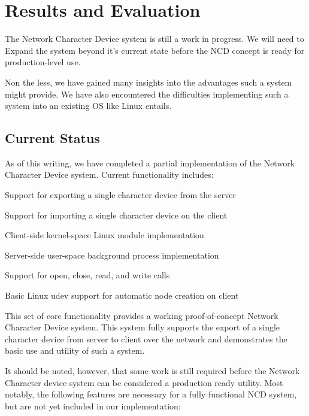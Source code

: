 \documentclass[11pt,twocolumn]{article}
\newenvironment{packed_item}{
\begin{itemize}
  \setlength{\itemsep}{1pt}
  \setlength{\parskip}{0pt}
  \setlength{\parsep}{0pt}
}{\end{itemize}}
\begin{document}

\section{Results and Evaluation}
\label{sec:results}

The Network Character Device system is still a work in
progress. We will need to Expand the system beyond it's current state
before the NCD concept is ready for production-level use.

Non the less, we have gained many insights into the advantages such a
system might provide. We have also encountered the difficulties
implementing such a system into an existing OS like Linux entails.

\subsection{Current Status}
\label{sec:currentstatus}

As of this writing, we have completed a partial implementation of
the Network Character Device system. Current functionality includes:

\begin{packed_item}
\item Support for exporting a single character device from the server
\item Support for importing a single character device on the client
\item Client-side kernel-space Linux module implementation
\item Server-side user-space background process implementation
\item Support for open, close, read, and write calls
\item Basic Linux udev support for automatic node creation on client
\end{packed_item}

This set of core functionality provides a working proof-of-concept
Network Character Device system. This system fully supports the
export of a single character device from server to client over the
network and demonstrates the basic use and utility of such a system.

It should be noted, however, that some work is still required before
the Network Character device system can be considered a production
ready utility. Most notably, the following features are necessary for
a fully functional NCD system, but are not yet included in our
implementation:
\end{document}

